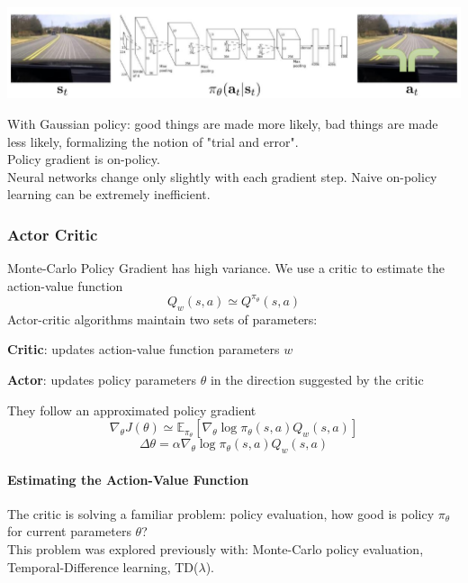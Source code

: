 \documentclass[10pt]{report}
\begin{document}
\begin{center}
	\includegraphics[scale=0.5]{183.png}
\end{center}
With Gaussian policy: good things are made more likely, bad things are made less likely, formalizing the notion of "trial and error".\\
Policy gradient is on-policy.\\
Neural networks change only slightly with each gradient step. Naive on-policy learning can be extremely inefficient.
\subsubsection{Actor Critic}
Monte-Carlo Policy Gradient has high variance. We use a critic to estimate the action-value function
$$Q_w(s,a)\simeq Q^{\pi_\theta}(s,a)$$
Actor-critic algorithms maintain two sets of parameters:
\begin{list}{}{}
	\item \textbf{Critic}: updates action-value function parameters $w$
	\item \textbf{Actor}: updates policy parameters $\theta$ in the direction suggested by the critic
\end{list}
They follow an approximated policy gradient
$$\nabla_\theta J(\theta) \simeq \mathbb{E}_{\pi_\theta}[\nabla_\theta\log\pi_\theta(s,a)Q_w(s,a)]$$
$$\Delta\theta = \alpha\nabla_\theta\log\pi_\theta(s,a)Q_w(s,a)$$
\paragraph{Estimating the Action-Value Function} The critic is solving a familiar problem: policy evaluation, how good is policy $\pi_\theta$ for current parameters $\theta$?\\
This problem was explored previously with: Monte-Carlo policy evaluation, Temporal-Difference learning, TD($\lambda$).
\end{document}
